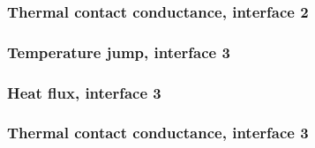 \begin{frame}
	\frametitle{Thermal contact conductance, interface 2}
	\begin{figure}[H]		
		\legendagraficos
	\end{figure}
\end{frame}

\begin{frame}
	\frametitle{Temperature jump, interface 3}
	\begin{figure}[H]		
		\legendagraficos	
		\graficosctclegenda		
	\end{figure}
\end{frame}

\begin{frame}
	\frametitle{Heat flux, interface 3}
	\begin{figure}[H]		
		\legendagraficos
		\graficosctclegenda		
	\end{figure}
\end{frame}

\begin{frame}
	\frametitle{Thermal contact conductance, interface 3}
	\begin{figure}[H]		
		\legendagraficos
	\end{figure}
\end{frame}
